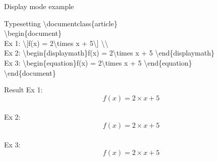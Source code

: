 \documentclass[10pt,xcolor={dvipsnames}]{beamer}
\begin{document}
		\begin{frame}{Display mode example}
			
			\begin{minipage}{.95\textwidth}
				\begin{block}{Typesetting}
					\textbackslash documentclass\{{\color{blue}article}\}\\
					
					\textbackslash begin\{{\color{blue}document}\}\\
					
					\quad Ex 1: {\color{orange}\textbackslash[}f(x) = 2\textbackslash times x + 5{\color{orange}\textbackslash]} \textbackslash\textbackslash\\
					
					\quad Ex 2: \textbackslash begin\{{\color{orange}displaymath}\}f(x) = 2\textbackslash times x + 5 \textbackslash end\{{\color{orange}displaymath}\}\\
					
					\quad Ex 3: \textbackslash begin\{{\color{orange}equation}\}f(x) = 2\textbackslash times x + 5 \textbackslash end\{{\color{orange}equation}\}\\
					
					\textbackslash end\{{\color{blue}document}\}\\
				\end{block}
			\end{minipage}
			
			\begin{minipage}{.95 \textwidth}
				\begin{block}{Result}
					Ex 1: \[f(x) = 2\times x + 5\] \\
					Ex 2: \begin{displaymath}	f(x) = 2\times x + 5 \end{displaymath}\\
					Ex 3: \begin{equation}	f(x) = 2\times x + 5 \end{equation}\\
				\end{block}
			\end{minipage}
		\end{frame}
	
\end{document}
